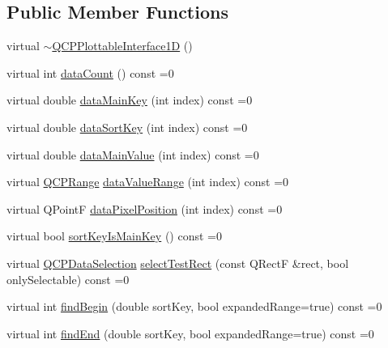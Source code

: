 \subsection*{Public Member Functions}
\begin{DoxyCompactItemize}
\item 
virtual \mbox{\hyperlink{class_q_c_p_plottable_interface1_d_a8829011d62208625f741f2d7e1cb6280}{$\sim$\+Q\+C\+P\+Plottable\+Interface1D}} ()
\item 
virtual int \mbox{\hyperlink{class_q_c_p_plottable_interface1_d_a058a22c770ef4d5a0e878a7f02183da9}{data\+Count}} () const =0
\item 
virtual double \mbox{\hyperlink{class_q_c_p_plottable_interface1_d_a2bd60daaac046945fead558cbd83cf73}{data\+Main\+Key}} (int index) const =0
\item 
virtual double \mbox{\hyperlink{class_q_c_p_plottable_interface1_d_afdc92f9f01e7e35f2e96b2ea9dc14ae7}{data\+Sort\+Key}} (int index) const =0
\item 
virtual double \mbox{\hyperlink{class_q_c_p_plottable_interface1_d_af6330919e8023277d08c958a6074fc76}{data\+Main\+Value}} (int index) const =0
\item 
virtual \mbox{\hyperlink{class_q_c_p_range}{Q\+C\+P\+Range}} \mbox{\hyperlink{class_q_c_p_plottable_interface1_d_a9ca7fcf14d885a200879768679b19be9}{data\+Value\+Range}} (int index) const =0
\item 
virtual Q\+PointF \mbox{\hyperlink{class_q_c_p_plottable_interface1_d_a78911838cfbcfd2d8df9ad2fdbfb8e93}{data\+Pixel\+Position}} (int index) const =0
\item 
virtual bool \mbox{\hyperlink{class_q_c_p_plottable_interface1_d_a229e65e7ab968dd6cd0e259fa504b79d}{sort\+Key\+Is\+Main\+Key}} () const =0
\item 
virtual \mbox{\hyperlink{class_q_c_p_data_selection}{Q\+C\+P\+Data\+Selection}} \mbox{\hyperlink{class_q_c_p_plottable_interface1_d_a67093e4ccf490ff5f7750640941ff34c}{select\+Test\+Rect}} (const Q\+RectF \&rect, bool only\+Selectable) const =0
\item 
virtual int \mbox{\hyperlink{class_q_c_p_plottable_interface1_d_a5b95783271306a4de97be54eac1e7d13}{find\+Begin}} (double sort\+Key, bool expanded\+Range=true) const =0
\item 
virtual int \mbox{\hyperlink{class_q_c_p_plottable_interface1_d_a5deced1016bc55a41a2339619045b295}{find\+End}} (double sort\+Key, bool expanded\+Range=true) const =0
\end{DoxyCompactItemize}


